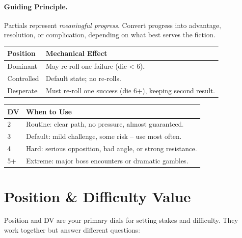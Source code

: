 \paragraph{Guiding Principle.}
Partials represent \emph{meaningful progress}. Convert progress into advantage, resolution, or complication, depending on what best serves the fiction.

\begin{tcolorbox}[title=Position Effects, colback=white!97!gray, colframe=black!80!gray]
\begin{tabularx}{\textwidth}{lX}
\toprule
\textbf{Position} & \textbf{Mechanical Effect} \\
\midrule
Dominant & May re-roll one failure (die < 6). \\
Controlled & Default state; no re-rolls. \\
Desperate & Must re-roll one success (die 6+), keeping second result. \\
\bottomrule
\end{tabularx}
\end{tcolorbox}

\begin{tcolorbox}[title=Difficulty Ladder – Beginner Focus, colback=white!97!gray, colframe=black!80!gray]
\begin{tabularx}{\textwidth}{lX}
\toprule
\textbf{DV} & \textbf{When to Use} \\
\midrule
2 & Routine: clear path, no pressure, almost guaranteed. \\
3 & Default: mild challenge, some risk – use most often. \\
4 & Hard: serious opposition, bad angle, or strong resistance. \\
5+ & Extreme: major boss encounters or dramatic gambles. \\
\bottomrule
\end{tabularx}
\end{tcolorbox}

\section{Position \& Difficulty Value}
\label{sec:position-dv}

Position and DV are your primary dials for setting stakes and difficulty. They work together but answer different questions:

